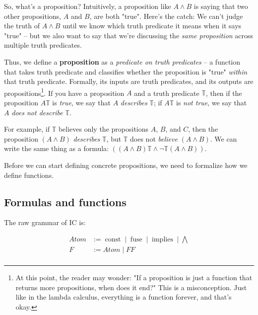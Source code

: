 \documentclass{article}
\begin{document}
  So, what's a proposition? Intuitively, a proposition like $A \wedge B$ is saying that two other propositions, $A$ and $B$, are both "true". Here's the catch: We can't judge the truth of $A \wedge B$ until we know which truth predicate it means when it says "true" – but we also want to say that we're discussing the \emph{same proposition} across multiple truth predicates.
    
  Thus, we define a \textbf{proposition} as a \emph{predicate on truth predicates} – a function that takes truth predicate and classifies whether the proposition is "true" \emph{within} that truth predicate. Formally, its inputs are truth predicates, and its outputs are propositions\footnote{At this point, the reader may wonder: "If a proposition is just a function that returns more propositions, when does it end?" This is a misconception. Just like in the lambda calculus, everything is a function forever, and that's okay.}. If you have a proposition $A$ and a truth predicate $\mathbb{T}$, then if the proposition $A \mathbb{T}$ is \emph{true}, we say that $A$ \emph{describes} $\mathbb{T}$; if $A \mathbb{T}$ is \emph{not true}, we say that $A$ \emph{does not describe} $\mathbb{T}$.
  
  For example, if $\mathbb{T}$ believes only the propositions $A$, $B$, and $C$, then the proposition $(A \wedge B)$ \emph{describes} $\mathbb{T}$, but $\mathbb{T}$ does not \emph{believe} $(A \wedge B)$. We can write the same thing as a formula: $((A \wedge B)\mathbb{T} \wedge \neg \mathbb{T}(A \wedge B))$.
  
  Before we can start defining concrete propositions, we need to formalize how we define functions.
  
  \subsection{Formulas and functions}
  
  The raw grammar of IC is:
  
  \newcommand{\id}{\operatorname{\mathrm{id}}}
  \newcommand{\const}{\operatorname{\mathrm{const}}}
  \newcommand{\fuse}{\operatorname{\mathrm{fuse}}}
  \newcommand{\atomimplies}{\operatorname{\mathrm{implies}}}
  \newcommand{\all}{\bigwedge}
  \begin{align*}
    Atom &:= \const \mid \fuse \mid \atomimplies \mid \all\\
    F &:= Atom \mid FF \\
  \end{align*}
  
\end{document}
